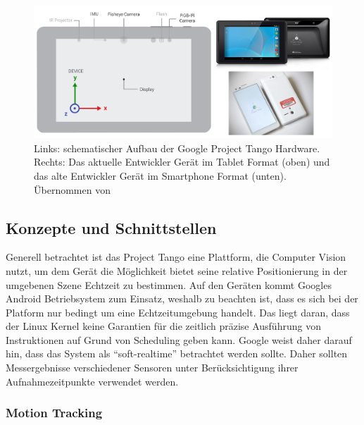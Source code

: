 \begin{figure}[h]
  \centering
	\includegraphics[width=1.0\textwidth]{content/images/theory/tango-device.png} 
  \caption{Links: schematischer Aufbau der Google Project Tango Hardware. Rechts: Das aktuelle Entwickler Gerät im Tablet Format (oben) und das alte Entwickler Gerät im Smartphone Format (unten). Übernommen von \citet{GoogleDevelopers:online}}
  \label{fig:tango-device}
\end{figure}

\subsection{Konzepte und Schnittstellen}

Generell betrachtet ist das Project Tango eine Plattform, die Computer Vision nutzt, um dem Gerät die Möglichkeit bietet seine relative Positionierung in der umgebenen Szene Echtzeit zu bestimmen. Auf den Geräten kommt Googles Android Betriebsystem zum Einsatz, weshalb zu beachten ist, dass es sich bei der Platform nur bedingt um eine Echtzeitumgebung handelt. Das liegt daran, dass der Linux Kernel keine Garantien für die zeitlich präzise Ausführung von Instruktionen auf Grund von Scheduling geben kann. Google weist daher darauf hin, dass das System als \enquote{soft-realtime} betrachtet werden sollte. Daher sollten Messergebnisse verschiedener Sensoren unter Berücksichtigung ihrer Aufnahmezeitpunkte verwendet werden. \citep{GoogleDevelopersConcepts:online} 

\subsubsection{Motion Tracking}

